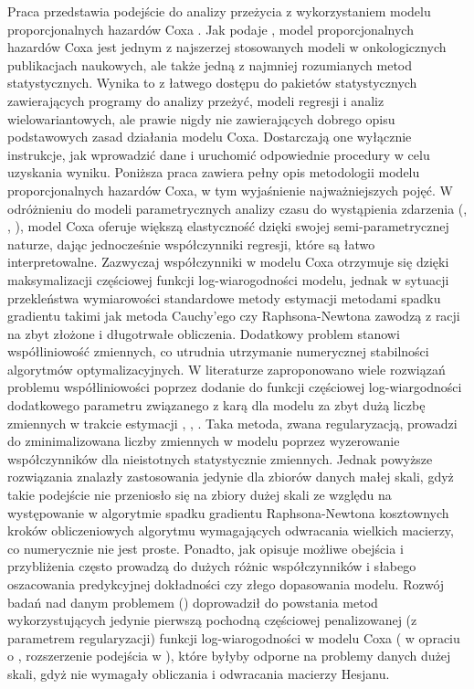 Praca przedstawia podejście do analizy przeżycia z wykorzystaniem modelu proporcjonalnych hazardów Coxa \cite{cox}. Jak podaje \cite{assel}, model proporcjonalnych hazardów Coxa jest jednym z najszerzej stosowanych modeli w onkologicznych publikacjach naukowych, ale także jedną z najmniej rozumianych metod statystycznych. Wynika to z łatwego dostępu do pakietów statystycznych zawierających programy do analizy przeżyć, modeli regresji i analiz wielowariantowych, ale prawie nigdy nie zawierających dobrego opisu podstawowych zasad działania modelu Coxa. Dostarczają one wyłącznie instrukcje, jak wprowadzić dane i uruchomić odpowiednie procedury w celu uzyskania wyniku. Poniższa praca zawiera pełny opis metodologii modelu proporcjonalnych hazardów Coxa, w tym wyjaśnienie najważniejszych pojęć. W odróżnieniu do modeli parametrycznych analizy czasu do wystąpienia zdarzenia (\cite{klein}, \cite{collett}, \cite{hosmer}), model Coxa oferuje większą elastyczność dzięki swojej semi-parametrycznej naturze, dając jednocześnie  współczynniki regresji, które są łatwo interpretowalne. Zazwyczaj współczynniki w modelu Coxa otrzymuje się dzięki maksymalizacji częściowej funkcji log-wiarogodności modelu, jednak w sytuacji przekleństwa wymiarowości standardowe metody estymacji metodami spadku gradientu takimi jak metoda Cauchy'ego czy Raphsona-Newtona zawodzą z racji na zbyt złożone i długotrwałe obliczenia. Dodatkowy problem stanowi współliniowość zmiennych, co utrudnia utrzymanie numerycznej stabilności algorytmów optymalizacyjnych. W literaturze zaproponowano wiele rozwiązań problemu współliniowości poprzez dodanie do funkcji częściowej log-wiargodności dodatkowego parametru związanego z karą dla modelu za zbyt dużą liczbę zmiennych w trakcie estymacji \cite{parkm}, \cite{sohn}, \cite{goemann}. Taka metoda, zwana regularyzacją, prowadzi do zminimalizowana liczby zmiennych w modelu poprzez wyzerowanie współczynników dla nieistotnych statystycznie zmiennych. Jednak powyższe rozwiązania znalazły zastosowania jedynie dla zbiorów danych małej skali, gdyż takie podejście nie przeniosło się na zbiory dużej skali ze względu na występowanie w algorytmie spadku gradientu Raphsona-Newtona kosztownych kroków obliczeniowych algorytmu wymagających odwracania wielkich macierzy, co numerycznie nie jest proste. Ponadto, jak opisuje \cite{mital} możliwe obejścia i przybliżenia często prowadzą do dużych różnic współczynników i słabego oszacowania predykcyjnej dokładności czy złego dopasowania modelu. Rozwój badań nad danym problemem (\cite{KIMKIM}) doprowadził do powstania metod wykorzystujących jedynie pierwszą pochodną częściowej penalizowanej (z parametrem regularyzacji) funkcji log-wiarogodności w modelu Coxa (\cite{sohn} w opraciu o \cite{KIM}, rozszerzenie podejścia w \cite{mital}), które byłyby odporne na problemy danych dużej skali, gdyż nie wymagały obliczania i odwracania macierzy Hesjanu. 

